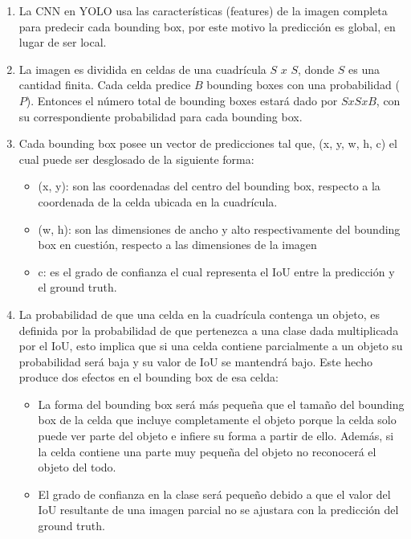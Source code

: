 \begin{enumerate}
    \item La CNN en YOLO usa las características (features) de la imagen completa para predecir cada bounding box, por este motivo la predicción es global, en lugar de ser local.
    \item La imagen es dividida en celdas de una cuadrícula $S$ $x$ $S$, donde $S$ es una cantidad finita. Cada celda predice $B$ bounding boxes con una probabilidad ($P$). Entonces el número total de bounding boxes estará dado por $S$$x$$S$$x$$B$, con su correspondiente probabilidad para cada bounding box.
    \item Cada bounding box posee un vector de predicciones tal que, (x, y, w, h, c) el cual puede ser desglosado de la siguiente forma:
    \begin{itemize}
        \item (x, y): son las coordenadas del centro del bounding box, respecto a la coordenada de la celda ubicada en la cuadrícula.
        \item (w, h): son las dimensiones de ancho y alto respectivamente del bounding box en cuestión, respecto a las dimensiones de la imagen
        \item c: es el grado de confianza el cual representa el IoU entre la predicción y el ground truth.
    \end{itemize}
    \item La probabilidad de que una celda en la cuadrícula contenga un objeto, es definida por la probabilidad de que pertenezca a una clase dada multiplicada por el IoU, esto implica que si una celda contiene parcialmente a un objeto su probabilidad será baja y su valor de IoU se mantendrá bajo. Este hecho produce dos efectos en el bounding box de esa celda:
    \begin{itemize}
        \item La forma del bounding box será más pequeña que el tamaño del bounding box de la celda que incluye completamente el objeto porque la celda solo puede ver parte del objeto e infiere su forma a partir de ello. Además, si la celda contiene una parte muy pequeña del objeto no reconocerá el objeto del todo.
        \item El grado de confianza en la clase será pequeño debido a que el valor del IoU resultante de una imagen parcial no se ajustara con la predicción del ground truth.
    \end{itemize}

\end{enumerate}
